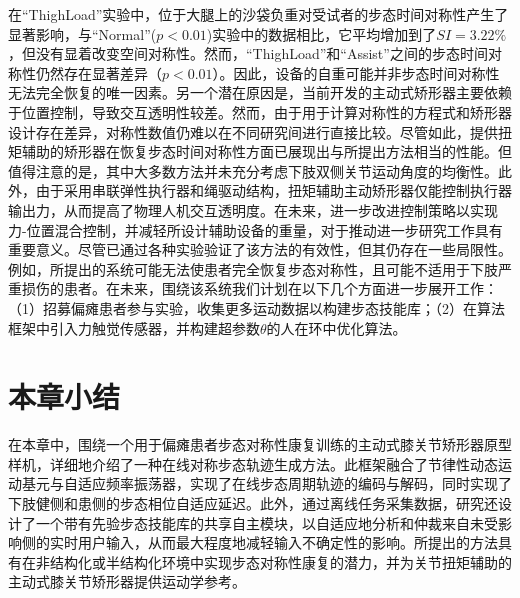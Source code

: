 在``ThighLoad''实验中，位于大腿上的沙袋负重对受试者的步态时间对称性产生了显著影响，与``Normal''($p<0.01$)实验中的数据相比，它平均增加到了${SI}=3.22 \%$，但没有显着改变空间对称性。然而，``ThighLoad''和``Assist''之间的步态时间对称性仍然存在显著差异（$p<0.01$）。因此，设备的自重可能并非步态时间对称性无法完全恢复的唯一因素。另一个潜在原因是，当前开发的主动式矫形器主要依赖于位置控制，导致交互透明性较差。然而，由于用于计算对称性的方程式和矫形器设计存在差异，对称性数值仍难以在不同研究间进行直接比较。尽管如此，提供扭矩辅助的矫形器在恢复步态时间对称性方面已展现出与所提出方法相当的性能。但值得注意的是，其中大多数方法并未充分考虑下肢双侧关节运动角度的均衡性。此外，由于采用串联弹性执行器和绳驱动结构，扭矩辅助主动矫形器仅能控制执行器输出力，从而提高了物理人机交互透明度。在未来，进一步改进控制策略以实现力-位置混合控制，并减轻所设计辅助设备的重量，对于推动进一步研究工作具有重要意义。尽管已通过各种实验验证了该方法的有效性，但其仍存在一些局限性。例如，所提出的系统可能无法使患者完全恢复步态对称性，且可能不适用于下肢严重损伤的患者。在未来，围绕该系统我们计划在以下几个方面进一步展开工作：（1）招募偏瘫患者参与实验，收集更多运动数据以构建步态技能库；（2）在算法框架中引入力触觉传感器，并构建超参数$\theta$的人在环中优化算法。

\section{本章小结}
在本章中，围绕一个用于偏瘫患者步态对称性康复训练的主动式膝关节矫形器原型样机，详细地介绍了一种在线对称步态轨迹生成方法。此框架融合了节律性动态运动基元与自适应频率振荡器，实现了在线步态周期轨迹的编码与解码，同时实现了下肢健侧和患侧的步态相位自适应延迟。此外，通过离线任务采集数据，研究还设计了一个带有先验步态技能库的共享自主模块，以自适应地分析和仲裁来自未受影响侧的实时用户输入，从而最大程度地减轻输入不确定性的影响。所提出的方法具有在非结构化或半结构化环境中实现步态对称性康复的潜力，并为关节扭矩辅助的主动式膝关节矫形器提供运动学参考。